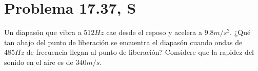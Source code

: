 \section*{Problema 17.37, S}

Un diapasón que vibra a $512Hz$ cae desde el reposo y acelera a $9.8m/s^2$. ¿Qué tan abajo del punto de liberación se encuentra el diapasón cuando ondas de $485Hz$ de frecuencia llegan al punto de liberación? Considere que la rapidez del sonido en el aire es de $340m/s$.







